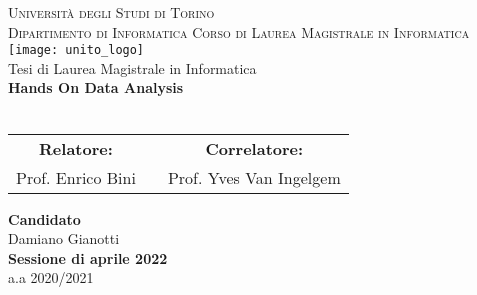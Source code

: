 \begin{titlepage}
    \thispagestyle{empty}
    \begin{center}
        \LARGE{\textsc{Università degli Studi di Torino}}                               \\
        \Large{\textsc{Dipartimento di Informatica}}
        \vskip 20pt
        \large{\textsc{Corso di Laurea Magistrale in Informatica}}                      \\
        \vskip 20pt
        \texttt{[image: unito\_logo]}                                         \\
        \vskip 10pt
        \large{Tesi di Laurea Magistrale in Informatica}                                \\
        \vskip 50pt
        \LARGE{\textbf{Hands On Data Analysis}}                      \\
        \LARGE{\textbf{}}                      \\
        \vskip 50pt
        \begin{tabularx}{\textwidth}{cXc}
            \Large{\textbf{Relatore:}}  &   &\Large{\textbf{Correlatore:}}              \\
            \Large{Prof. Enrico Bini} &   &\Large{Prof. Yves Van Ingelgem}       \\
        \end{tabularx}
        \vskip 40pt
        \Large{\textbf{Candidato}}                                                      \\
        \Large{Damiano Gianotti}                                                           \\
        \vskip 40pt
        \textbf{Sessione di aprile 2022}                                               \\
        a.a 2020/2021
    \end{center}
\end{titlepage}
\cleardoublepage 